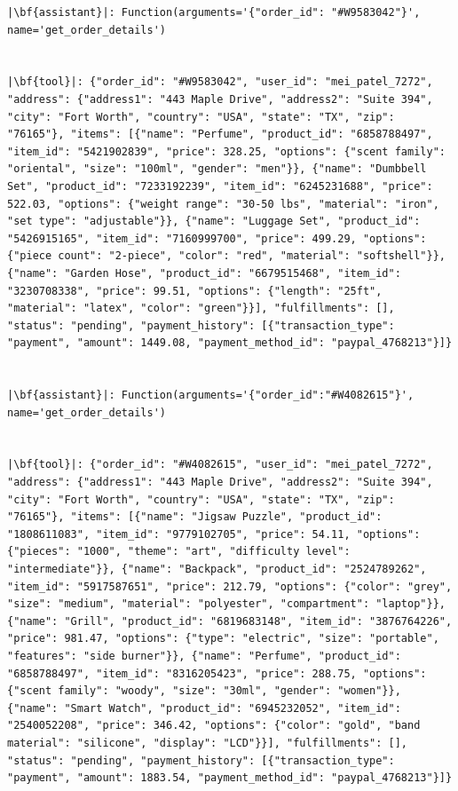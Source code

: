 \begin{verbatim}
|\bf{assistant}|: Function(arguments='{"order_id": "#W9583042"}', name='get_order_details')


|\bf{tool}|: {"order_id": "#W9583042", "user_id": "mei_patel_7272", "address": {"address1": "443 Maple Drive", "address2": "Suite 394", "city": "Fort Worth", "country": "USA", "state": "TX", "zip": "76165"}, "items": [{"name": "Perfume", "product_id": "6858788497", "item_id": "5421902839", "price": 328.25, "options": {"scent family": "oriental", "size": "100ml", "gender": "men"}}, {"name": "Dumbbell Set", "product_id": "7233192239", "item_id": "6245231688", "price": 522.03, "options": {"weight range": "30-50 lbs", "material": "iron", "set type": "adjustable"}}, {"name": "Luggage Set", "product_id": "5426915165", "item_id": "7160999700", "price": 499.29, "options": {"piece count": "2-piece", "color": "red", "material": "softshell"}}, {"name": "Garden Hose", "product_id": "6679515468", "item_id": "3230708338", "price": 99.51, "options": {"length": "25ft", "material": "latex", "color": "green"}}], "fulfillments": [], "status": "pending", "payment_history": [{"transaction_type": "payment", "amount": 1449.08, "payment_method_id": "paypal_4768213"}]}


|\bf{assistant}|: Function(arguments='{"order_id":"#W4082615"}', name='get_order_details')


|\bf{tool}|: {"order_id": "#W4082615", "user_id": "mei_patel_7272", "address": {"address1": "443 Maple Drive", "address2": "Suite 394", "city": "Fort Worth", "country": "USA", "state": "TX", "zip": "76165"}, "items": [{"name": "Jigsaw Puzzle", "product_id": "1808611083", "item_id": "9779102705", "price": 54.11, "options": {"pieces": "1000", "theme": "art", "difficulty level": "intermediate"}}, {"name": "Backpack", "product_id": "2524789262", "item_id": "5917587651", "price": 212.79, "options": {"color": "grey", "size": "medium", "material": "polyester", "compartment": "laptop"}}, {"name": "Grill", "product_id": "6819683148", "item_id": "3876764226", "price": 981.47, "options": {"type": "electric", "size": "portable", "features": "side burner"}}, {"name": "Perfume", "product_id": "6858788497", "item_id": "8316205423", "price": 288.75, "options": {"scent family": "woody", "size": "30ml", "gender": "women"}}, {"name": "Smart Watch", "product_id": "6945232052", "item_id": "2540052208", "price": 346.42, "options": {"color": "gold", "band material": "silicone", "display": "LCD"}}], "fulfillments": [], "status": "pending", "payment_history": [{"transaction_type": "payment", "amount": 1883.54, "payment_method_id": "paypal_4768213"}]}



\end{verbatim}
